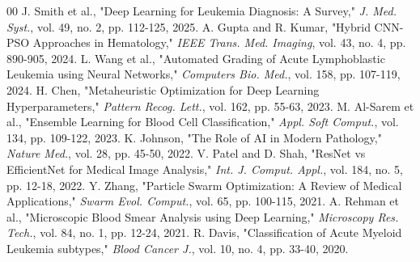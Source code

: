 \documentclass[conference]{IEEEtran}
\begin{document}
\begin{thebibliography}{00}
 J. Smith et al., "Deep Learning for Leukemia Diagnosis: A Survey," \textit{J. Med. Syst.}, vol. 49, no. 2, pp. 112-125, 2025.
 A. Gupta and R. Kumar, "Hybrid CNN-PSO Approaches in Hematology," \textit{IEEE Trans. Med. Imaging}, vol. 43, no. 4, pp. 890-905, 2024.
 L. Wang et al., "Automated Grading of Acute Lymphoblastic Leukemia using Neural Networks," \textit{Computers Bio. Med.}, vol. 158, pp. 107-119, 2024.
 H. Chen, "Metaheuristic Optimization for Deep Learning Hyperparameters," \textit{Pattern Recog. Lett.}, vol. 162, pp. 55-63, 2023.
 M. Al-Sarem et al., "Ensemble Learning for Blood Cell Classification," \textit{Appl. Soft Comput.}, vol. 134, pp. 109-122, 2023.
 K. Johnson, "The Role of AI in Modern Pathology," \textit{Nature Med.}, vol. 28, pp. 45-50, 2022.
 V. Patel and D. Shah, "ResNet vs EfficientNet for Medical Image Analysis," \textit{Int. J. Comput. Appl.}, vol. 184, no. 5, pp. 12-18, 2022.
 Y. Zhang, "Particle Swarm Optimization: A Review of Medical Applications," \textit{Swarm Evol. Comput.}, vol. 65, pp. 100-115, 2021.
 A. Rehman et al., "Microscopic Blood Smear Analysis using Deep Learning," \textit{Microscopy Res. Tech.}, vol. 84, no. 1, pp. 12-24, 2021.
 R. Davis, "Classification of Acute Myeloid Leukemia subtypes," \textit{Blood Cancer J.}, vol. 10, no. 4, pp. 33-40, 2020.
\end{thebibliography}
\end{document}
